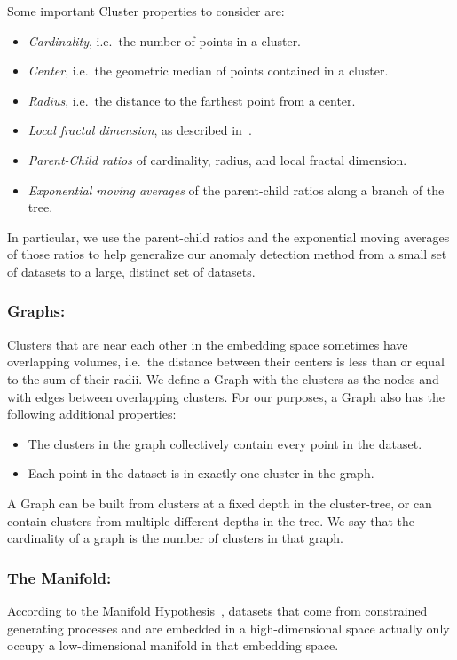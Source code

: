 Some important Cluster properties to consider are:
\begin{itemize}
    \item \textit{Cardinality}, i.e.\ the number of points in a cluster.
    \item \textit{Center}, i.e.\ the geometric median of points contained in a cluster.
    \item \textit{Radius}, i.e.\ the distance to the farthest point from a center.
    \item \textit{Local fractal dimension}, as described in~\cite{ishaq2019entropy}.
    \item \textit{Parent-Child ratios} of cardinality, radius, and local fractal dimension.
    \item \textit{Exponential moving averages} of the parent-child ratios along a branch of the tree.
\end{itemize}
In particular, we use the parent-child ratios and the exponential moving averages of those ratios to help generalize our anomaly detection method from a small set of datasets to a large, distinct set of datasets.

\subsubsection*{Graphs:}
Clusters that are near each other in the embedding space sometimes have overlapping volumes, i.e.\ the distance between their centers is less than or equal to the sum of their radii.
We define a Graph with the clusters as the nodes and with edges between overlapping clusters.
For our purposes, a Graph also has the following additional properties:
\begin{itemize}
    \item The clusters in the graph collectively contain every point in the dataset.
    \item Each point in the dataset is in exactly one cluster in the graph.
\end{itemize}
A Graph can be built from clusters at a fixed depth in the cluster-tree, or can contain clusters from multiple different depths in the tree.
We say that the cardinality of a graph is the number of clusters in that graph.

\subsubsection*{The Manifold:}
According to the Manifold Hypothesis~\cite{fefferman2016testing}, datasets that come from constrained generating processes and are embedded in a high-dimensional space actually only occupy a low-dimensional manifold in that embedding space.

